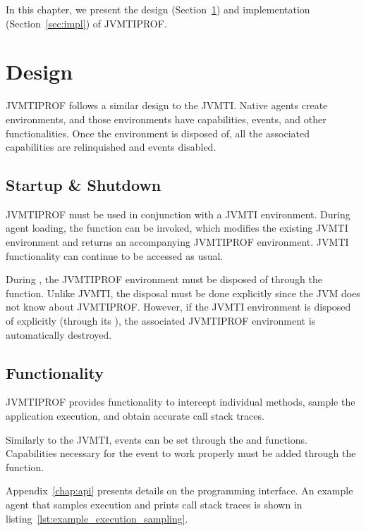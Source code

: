 \label{cap:methodology}

In this chapter, we present the design (Section~\ref{sec:design}) and implementation (Section~\ref{sec:impl}) of JVMTIPROF.

\section{Design} \label{sec:design}

JVMTIPROF follows a similar design to the JVMTI. Native agents create environments, and those environments have capabilities, events, and other functionalities. Once the environment is disposed of, all the associated capabilities are relinquished and events disabled.

\subsection{Startup \& Shutdown}

JVMTIPROF must be used in conjunction with a JVMTI environment. During agent loading, the  function can be invoked, which modifies the existing JVMTI environment and returns an accompanying JVMTIPROF environment. JVMTI functionality can continue to be accessed as usual.

During , the JVMTIPROF environment must be disposed of through the  function. Unlike JVMTI, the disposal must be done explicitly since the JVM does not know about JVMTIPROF. However, if the JVMTI environment is disposed of explicitly (through its ), the associated JVMTIPROF environment is automatically destroyed.

\subsection{Functionality}

JVMTIPROF provides functionality to intercept individual methods, sample the application execution, and obtain accurate call stack traces.

Similarly to the JVMTI, events can be set through the  and  functions. Capabilities necessary for the event to work properly must be added through the  function.

Appendix~\ref{chap:api} presents details on the programming interface. An example agent that samples execution and prints call stack traces is shown in listing~\ref{lst:example_execution_sampling}.

